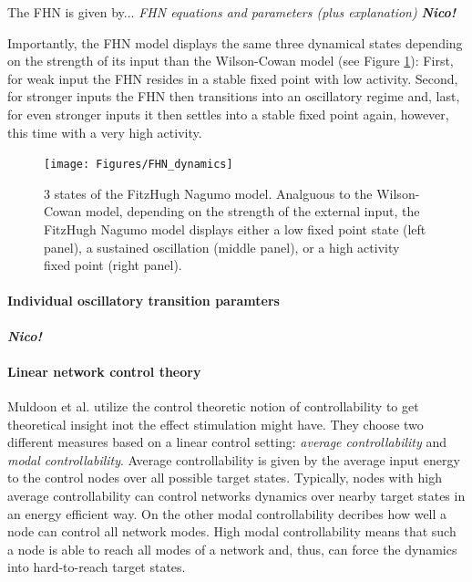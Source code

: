 The FHN is given by...\textit{  FHN equations and parameters (plus explanation)} \textbf{\textit{Nico!}}


Importantly, the FHN model displays the same three dynamical states depending on the strength of its input than the Wilson-Cowan model (see Figure \ref{fig:FHN}): 
First, for weak input the FHN resides in a stable fixed point with low activity. Second, for stronger inputs the FHN then transitions into an oscillatory
regime and, last, for even stronger inputs it then settles into a stable fixed point again, however, this time with a very high activity.

\begin{figure}
\texttt{[image: Figures/FHN\_dynamics]}
 \caption{ 3 states of the FitzHugh Nagumo model. Analguous to the Wilson-Cowan model, depending on the strength of the external input, the FitzHugh Nagumo
 model displays either a low fixed point state (left panel), a sustained oscillation (middle panel), or a high activity fixed point (right panel).}
 \label{fig:FHN}
\end{figure}


\paragraph{Individual oscillatory transition paramters}
\textbf{\textit{Nico!}}



\paragraph{Linear network control theory}
Muldoon et al. \supercite{Muldoon2016} utilize the control theoretic notion of controllability to get theoretical insight inot the effect stimulation might have.
They choose two different measures based on a linear control setting: \textit{average controllability} and \textit{modal controllability}. Average controllability 
is given by the average input energy to the control nodes over all possible target states. Typically, nodes with high average controllability can control networks 
dynamics over nearby target states in an energy efficient way. On the other modal controllability decribes how well a node can control all network modes. High modal 
controllability means that such a node is able to reach all modes of a network and, thus, can force the dynamics into hard-to-reach target states.

